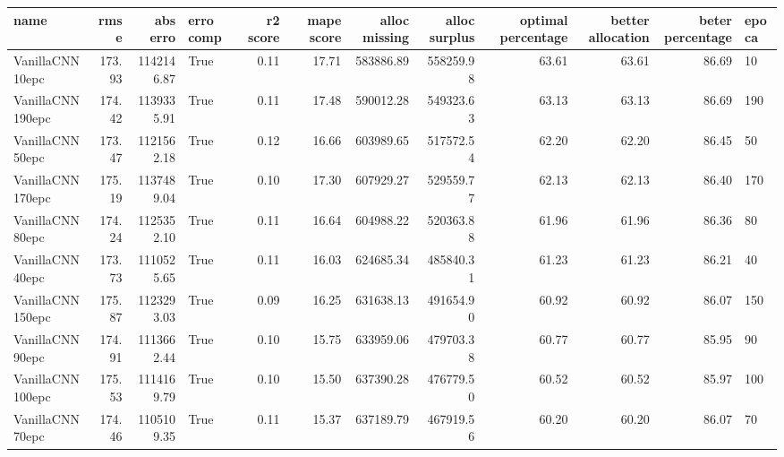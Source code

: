 \begin{tabular}{lrrlrrrrrrrl}
\toprule
name & rmse & abs erro & erro comp & r2 score & mape score & alloc missing & alloc surplus & optimal percentage & better allocation & beter percentage & epoca \\
\midrule
VanillaCNN10epc & 173.93 & 1142146.87 & True & 0.11 & 17.71 & 583886.89 & 558259.98 & 63.61 & 63.61 & 86.69 & 10 \\
VanillaCNN190epc & 174.42 & 1139335.91 & True & 0.11 & 17.48 & 590012.28 & 549323.63 & 63.13 & 63.13 & 86.69 & 190 \\
VanillaCNN50epc & 173.47 & 1121562.18 & True & 0.12 & 16.66 & 603989.65 & 517572.54 & 62.20 & 62.20 & 86.45 & 50 \\
VanillaCNN170epc & 175.19 & 1137489.04 & True & 0.10 & 17.30 & 607929.27 & 529559.77 & 62.13 & 62.13 & 86.40 & 170 \\
VanillaCNN80epc & 174.24 & 1125352.10 & True & 0.11 & 16.64 & 604988.22 & 520363.88 & 61.96 & 61.96 & 86.36 & 80 \\
VanillaCNN40epc & 173.73 & 1110525.65 & True & 0.11 & 16.03 & 624685.34 & 485840.31 & 61.23 & 61.23 & 86.21 & 40 \\
VanillaCNN150epc & 175.87 & 1123293.03 & True & 0.09 & 16.25 & 631638.13 & 491654.90 & 60.92 & 60.92 & 86.07 & 150 \\
VanillaCNN90epc & 174.91 & 1113662.44 & True & 0.10 & 15.75 & 633959.06 & 479703.38 & 60.77 & 60.77 & 85.95 & 90 \\
VanillaCNN100epc & 175.53 & 1114169.79 & True & 0.10 & 15.50 & 637390.28 & 476779.50 & 60.52 & 60.52 & 85.97 & 100 \\
VanillaCNN70epc & 174.46 & 1105109.35 & True & 0.11 & 15.37 & 637189.79 & 467919.56 & 60.20 & 60.20 & 86.07 & 70 \\
\bottomrule
\end{tabular}
